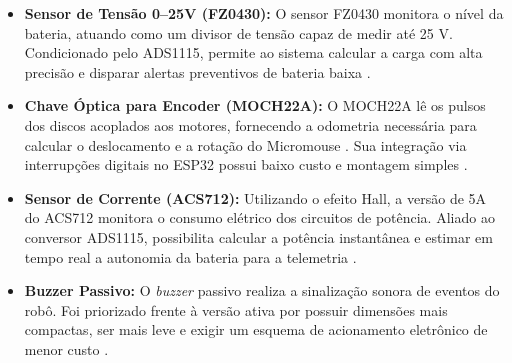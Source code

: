 \begin{itemize}
    \item \textbf{Sensor de Tensão 0--25V (FZ0430):} O sensor FZ0430 monitora o nível da bateria, atuando como um divisor de tensão capaz de medir até 25 V. Condicionado pelo ADS1115, permite ao sistema calcular a carga com alta precisão e disparar alertas preventivos de bateria baixa \cite{valdovinos2019instrumentacion}.

    \item \textbf{Chave Óptica para Encoder (MOCH22A):} O MOCH22A lê os pulsos dos discos acoplados aos motores, fornecendo a odometria necessária para calcular o deslocamento e a rotação do Micromouse \cite{petercorke}. Sua integração via interrupções digitais no ESP32 possui baixo custo e montagem simples \cite{makerhero_moch22a}.

    \item \textbf{Sensor de Corrente (ACS712):} Utilizando o efeito Hall, a versão de 5A do ACS712 monitora o consumo elétrico dos circuitos de potência. Aliado ao conversor ADS1115, possibilita calcular a potência instantânea e estimar em tempo real a autonomia da bateria para a telemetria \cite{valdovinos2019instrumentacion}.

    \item \textbf{Buzzer Passivo:} O \textit{buzzer} passivo realiza a sinalização sonora de eventos do robô. Foi priorizado frente à versão ativa por possuir dimensões mais compactas, ser mais leve e exigir um esquema de acionamento eletrônico de menor custo \cite{makerhero_buzzer}.

\end{itemize}



